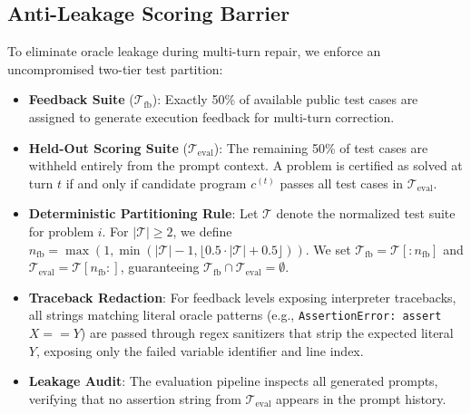 \documentclass[letterpaper]{article} %
\begin{document}
\subsection{Anti-Leakage Scoring Barrier}
To eliminate oracle leakage during multi-turn repair, we enforce an uncompromised two-tier test partition:
\begin{itemize}
    \item \textbf{Feedback Suite} ($\mathcal{T}_{\text{fb}}$): Exactly 50\% of available public test cases are assigned to generate execution feedback for multi-turn correction.
    \item \textbf{Held-Out Scoring Suite} ($\mathcal{T}_{\text{eval}}$): The remaining 50\% of test cases are withheld entirely from the prompt context. A problem is certified as solved at turn $t$ if and only if candidate program $c^{(t)}$ passes all test cases in $\mathcal{T}_{\text{eval}}$.
    \item \textbf{Deterministic Partitioning Rule}: Let $\mathcal{T}$ denote the normalized test suite for problem $i$. For $|\mathcal{T}| \ge 2$, we define $n_{\text{fb}} = \max(1, \min(|\mathcal{T}| - 1, \lfloor 0.5 \cdot |\mathcal{T}| + 0.5 \rfloor))$. We set $\mathcal{T}_{\text{fb}} = \mathcal{T}[:n_{\text{fb}}]$ and $\mathcal{T}_{\text{eval}} = \mathcal{T}[n_{\text{fb}}:]$, guaranteeing $\mathcal{T}_{\text{fb}} \cap \mathcal{T}_{\text{eval}} = \emptyset$.
    \item \textbf{Traceback Redaction}: For feedback levels exposing interpreter tracebacks, all strings matching literal oracle patterns (e.g., \texttt{AssertionError: assert $X == Y$}) are passed through regex sanitizers that strip the expected literal $Y$, exposing only the failed variable identifier and line index.
    \item \textbf{Leakage Audit}: The evaluation pipeline inspects all generated prompts, verifying that no assertion string from $\mathcal{T}_{\text{eval}}$ appears in the prompt history.
\end{itemize}
\end{document}
